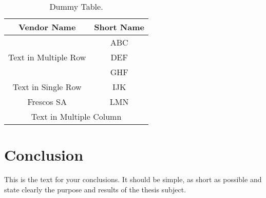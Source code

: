 \begin{table}[H]
	\centering
	\caption{Dummy Table.}
	\begin{tabular}{|c|c|} \hline
		\textbf{Vendor Name} 				& \textbf{Short Name}	\\ \hline
		\multirow{3}{*}{Text in Multiple Row}		&	ABC			\\ \cline{2-2}
		 								&        DEF			\\ \cline{2-2}
										&        GHF	\\ \hline
		Text in Single Row					&        IJK			\\ \hline
		Frescos SA						&        LMN	\\ \hline
 \multicolumn{2}{|c|}{Text in Multiple Column}							\\ \hline
	\end{tabular}
	\label{tab:dummytable}
\end{table}

\section{Conclusion}

This is the text for your conclusions. It should be simple, as short as possible and state clearly the purpose and results of the thesis subject.

